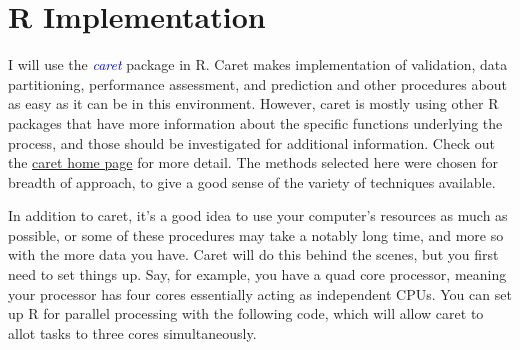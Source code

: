 \documentclass[english,nohyper,titlepage]{tufte-handout}\usepackage{knitr}
\begin{document}
\section{R Implementation}
I will use the \emph{\textcolor{blue}{caret}} package in R.  Caret makes implementation of validation, data partitioning, performance assessment, and prediction and other procedures about as easy as it can be in this environment.  However, caret is mostly using other R packages that have more information about the specific functions underlying the process, and those should be investigated for additional information.  Check out the \href{http://caret.r-forge.r-project.org/}{caret home page} for more detail. The methods selected here were chosen for breadth of approach, to give a good sense of the variety of techniques available.

In addition to caret, it's a good idea to use your computer's resources as much as possible, or some of these procedures may take a notably long time, and more so with the more data you have.  Caret will do this behind the scenes, but you first need to set things up. Say, for example, you have a quad core processor, meaning your processor has four cores essentially acting as independent CPUs. You can set up R for parallel processing with the following code, which will allow caret to allot tasks to three cores simultaneously.

\begin{knitrout}\footnotesize
{}\color{fgcolor}\begin{kframe}
\begin{alltt}
\hlstd{(}\hlstd{(}\hlstd{,}  \hlstd{=} \hlstd{))}
\end{alltt}
\end{kframe}
\end{knitrout}
\end{document}
